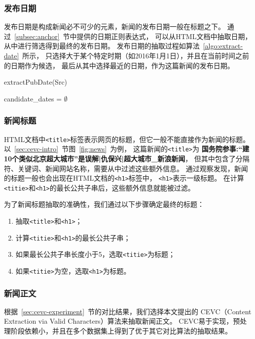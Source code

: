 \subsubsection{发布日期}
发布日期是构成新闻必不可少的元素，新闻的发布日期一般在标题之下。
通过~\ref{subsec:anchor}~节中提供的日期正则表达式，
可以从HTML文档中抽取日期，从中进行筛选得到最终的发布日期。
发布日期的抽取过程如算法~\ref{algo:extract-date}~所示，
只选择大于某个特定时期（如2016年1月1日），并且在当前时间之前的日期作为候选，
最后从其中选择最近的日期，作为这篇新闻的发布日期。

\begin{algorithm}[htbp]
\caption{extractPubDate(Src)}
\label{algo:extract-date}

candidate\_dates = $\emptyset$ \;
\end{algorithm}

\subsubsection{新闻标题}
HTML文档中\texttt{<title>}标签表示网页的标题，但它一般不能直接作为新闻的标题。
以~\ref{sec:cevc-intro}~节图~\ref{fig:news}~为例，
这篇新闻的\texttt{<title>}为
\textbf{国务院参事:“建10个类似北京超大城市”是误解|仇保兴|超大城市\_新浪新闻}，
但其中包含了分隔符、关键词、新闻网站名称，需要从中过滤这些额外信息。
通过观察发现，新闻的标题一般也会出现在HTML文档的\texttt{<h1>}标签中，
\texttt{<h1>}表示一级标题。
在计算\texttt{<titie>}和\texttt{<h1>}的最长公共子串后，这些额外信息就能被过滤。

为了新闻标题抽取的准确性，我们通过以下步骤确定最终的标题：
\begin{enumerate}
\item 抽取\texttt{<title>}和\texttt{<h1>}；
\item 计算\texttt{<titie>}和\texttt{<h1>}的最长公共子串；
\item 如果最长公共子串长度小于5，选取\texttt{<titie>}为标题；
\item 如果\texttt{<titie>}为空，选取\texttt{<h1>}为标题。
\end{enumerate}

\subsubsection{新闻正文}
根据~\ref{sec:cevc-experiment}~节的对比结果，我们选择本文提出的
CEVC（Content Extraction via Valid Characters）算法来抽取新闻正文。
CEVC易于实现，预处理阶段依赖小，并且在多个数据集上得到了优于其它对比算法的抽取结果。

